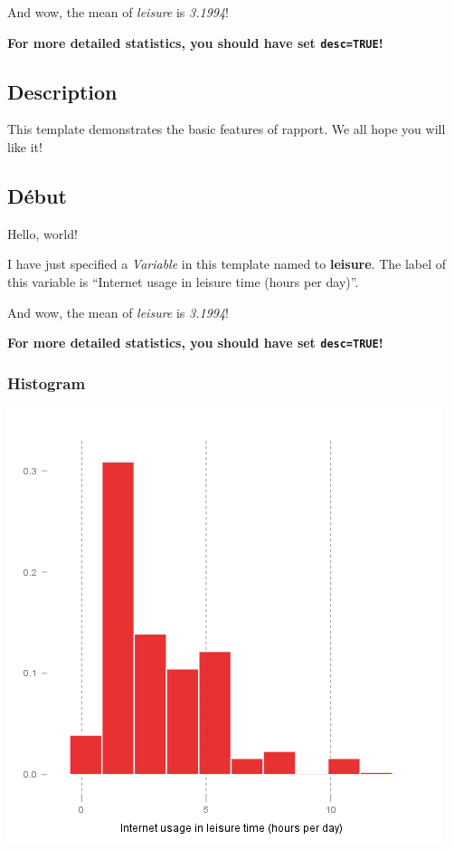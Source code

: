 \documentclass[]{article}
\makeatletter
\def\maxwidth{\ifdim\Gin@nat@width>\linewidth\linewidth
\else\Gin@nat@width\fi}
\let\Oldincludegraphics\includegraphics
\renewcommand{\includegraphics}[1]{\Oldincludegraphics[width=\maxwidth]{#1}}
\makeatother
\begin{document}
And wow, the mean of \emph{leisure} is \emph{3.1994}!

\textbf{For more detailed statistics, you should have set
\texttt{desc=TRUE}!}

\subsection{Description}

This template demonstrates the basic features of rapport. We all hope
you will like it!

\subsection{Début}

Hello, world!

I have just specified a \emph{Variable} in this template named to
\textbf{leisure}. The label of this variable is ``Internet usage in
leisure time (hours per day)''.

And wow, the mean of \emph{leisure} is \emph{3.1994}!

\textbf{For more detailed statistics, you should have set
\texttt{desc=TRUE}!}

\subsubsection{Histogram}

\href{ae1d2677d19224aec6e79aa6edd92e0e-hires.png}{\includegraphics{ae1d2677d19224aec6e79aa6edd92e0e.png}}
\end{document}
